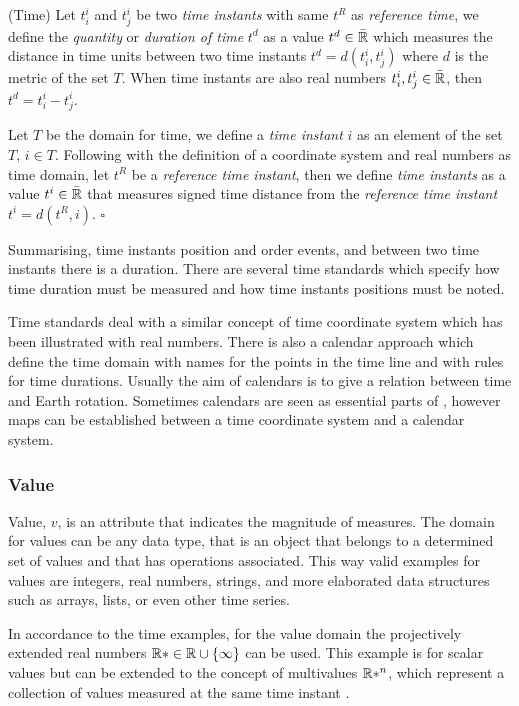 \begin{definition}(Time)
  \label{def:model:temps}
  Let $t^i_i$ and $t^i_j$ be two \emph{time instants} with same $t^R$
  as \emph{reference time}, we define the \emph{quantity} or
  \emph{duration of time} $t^d$ as a value $t^d \in\bar{\mathbb{R}}$ which measures
  the distance in time units between two time instants $t^d =
  d(t^i_i,t^i_j)$ where $d$ is the metric of the set $T$. When time
  instants are also real numbers $t^i_i , t^i_j \in \bar{\mathbb{R}}$, then $t^d =
  t^i_i - t^i_j$.

  Let $T$ be the domain for time, we define a \emph{time instant} $i$
  as an element of the set $T$, $i \in T$. Following with the definition of
  a coordinate system and real numbers as time domain, let $t^{R}$ be
  a \emph{reference time instant}, then we define \emph{time instants}
  as a value $t^i \in\bar{\mathbb{R}}$ that measures signed time distance from the
  \emph{reference time instant} $t^i= d(t^{R},i)$. $\square$
\end{definition}

Summarising, time instants position and order events, and between two
time instants there is a duration.  There are several time standards
\cite{allen:timescales} which specify how time duration must be
measured and how time instants positions must be noted.

Time standards deal with a similar concept of time coordinate system
which has been illustrated with real numbers. There is also a calendar
approach which define the time domain with names for the points in the
time line and with rules for time durations. Usually the aim of
calendars is to give a relation between time and Earth
rotation. Sometimes calendars are seen as essential parts of 
\cite{dreyer94}, however maps can be established between a time
coordinate system and a calendar system.



\subsubsection{Value}

Value, $v$, is an attribute that indicates the magnitude of measures. The
domain for values can be any data type, that is an object that belongs
to a determined set of values and that has operations associated.
This way valid examples for values are integers, real numbers,
strings, and more elaborated data structures such as arrays, lists, or
even other time series.

In accordance to the time examples, for the value domain the
projectively extended real numbers $\mathbb{R}* \in \mathbb{R} \cup \{\infty\}$ can be
used.  This example is for scalar values but can be extended to the
concept of multivalues $\mathbb{R}*^n$, which represent a collection of values
measured at the same time instant \cite{assfalg08:thesis}.




